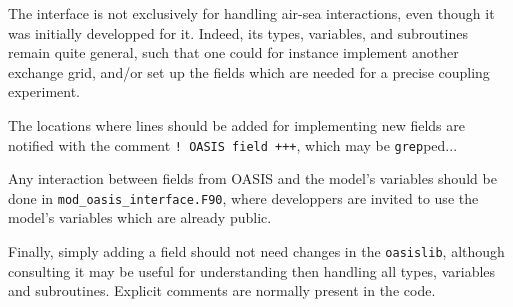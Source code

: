 The interface is not exclusively for handling air-sea interactions, even though it was
initially developped for it. Indeed, its types, variables, and subroutines remain quite
general, such that one could for instance implement another exchange grid, and/or set up
the fields which are needed for a precise coupling experiment.

The locations where lines should be added for implementing new fields are notified with
the comment \verb=! OASIS field +++=, which may be \verb=grep=ped...

Any interaction between fields from OASIS and the model's variables should be done in
\verb=mod_oasis_interface.F90=, where developpers are invited to use the model's variables
which are already public.

Finally, simply adding a field should not need changes in the \verb=oasislib=, although
consulting it may be useful for understanding then handling all types, variables and
subroutines. Explicit comments are normally present in the code.
